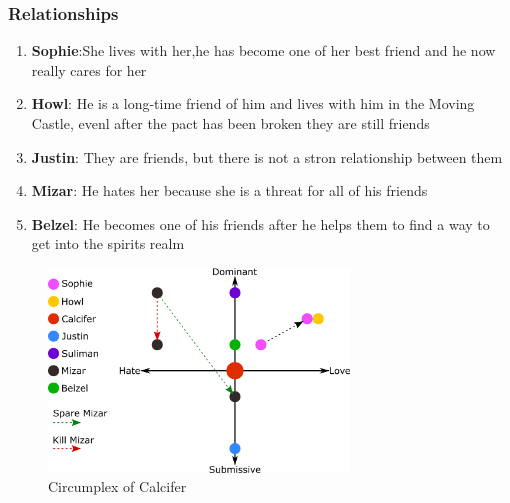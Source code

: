 
\subsubsection*{Relationships}
\begin{enumerate}
\item \textbf{Sophie}:She lives with her,he has become one of her best friend and he now really cares for her
\item \textbf{Howl}: He is a long-time friend of him and lives with him in the Moving Castle, evenl after the pact has been broken they are still friends
\item \textbf{Justin}: They are friends, but there is not a stron relationship between them
\item \textbf{Mizar}: He hates her because she is a threat for all of his friends
\item \textbf{Belzel}: He becomes one of his friends after he helps them to find a way to get into the spirits realm
\end{enumerate}

\begin{figure}[H]
  \centering
  \includegraphics[width=8cm]{Images/SVG/Exported/Circumplexes/calciferCircumplex}
  \caption{Circumplex of Calcifer}
\end{figure}


